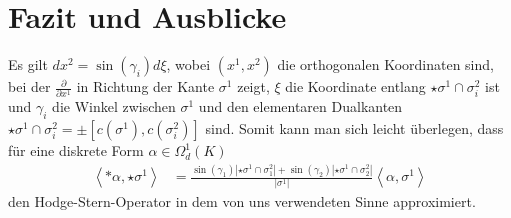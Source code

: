 \chapter{Fazit und Ausblicke}


Es gilt \( dx^{2}= \sin\left( \gamma_{i} \right) d\xi \), 
wobei \( \left( x^{1},x^{2} \right) \) die orthogonalen Koordinaten sind,
bei der \( \frac{\partial}{\partial x^{1}} \) in Richtung der Kante \( \sigma^{1} \) zeigt,
\( \xi \) die Koordinate entlang \( \star\sigma^{1}\cap\sigma^{2}_{i} \) ist
und \( \gamma_{i} \) die Winkel zwischen \( \sigma^{1} \) und den elementaren Dualkanten
\( \star\sigma^{1}\cap\sigma^{2}_{i} = \pm \left[ c(\sigma^{1}),c(\sigma^{2}_{i})  \right] \) sind.
Somit kann man sich leicht überlegen, dass für eine diskrete Form \( \alpha\in\Omega^{1}_{d}(K) \)
\begin{align}
  \left\langle *\alpha, \star\sigma^{1} \right\rangle
      &= \frac{\sin\left( \gamma_{1} \right)\left| \star\sigma^{1}\cap\sigma^{2}_{1} \right|
              +\sin\left( \gamma_{2} \right)\left| \star\sigma^{1}\cap\sigma^{2}_{2} \right| }
              {\left| \sigma^{1} \right|}
           \left\langle \alpha,\sigma^{1} \right\rangle
\end{align}
den Hodge-Stern-Operator in dem von uns verwendeten Sinne approximiert.

